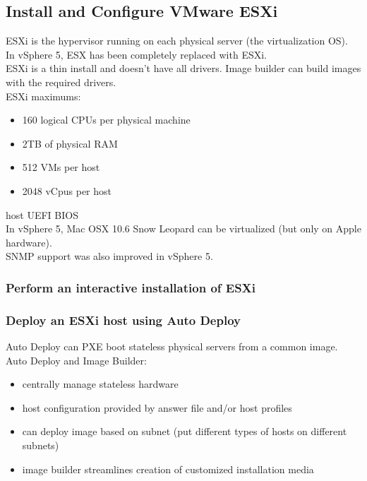 \subsection{Install and Configure VMware ESXi}

ESXi is the hypervisor running on each physical server (the virtualization
OS).\\

In vSphere 5, ESX has been completely replaced with ESXi.\\

ESXi is a thin install and doesn't have all drivers. Image builder can build
images with the required drivers.\\

ESXi maximums:

\begin{itemize}

\item 160 logical CPUs per physical machine
\item 2TB of physical RAM
\item 512 VMs per host
\item 2048 vCpus per host

\end{itemize}

host UEFI BIOS\\

In vSphere 5, Mac OSX 10.6 Snow Leopard can be virtualized (but only on Apple
hardware).\\

SNMP support was also improved in vSphere 5.

\subsubsection{Perform an interactive installation of ESXi}

\subsubsection{Deploy an ESXi host using Auto Deploy}

Auto Deploy can PXE boot stateless physical servers from a common image.\\

Auto Deploy and Image Builder:

\begin{itemize}
\item centrally manage stateless hardware
\item host configuration provided by answer file and/or host profiles
\item can deploy image based on subnet (put different types of hosts on
different subnets)
\item image builder streamlines creation of customized installation media
\end{itemize}

